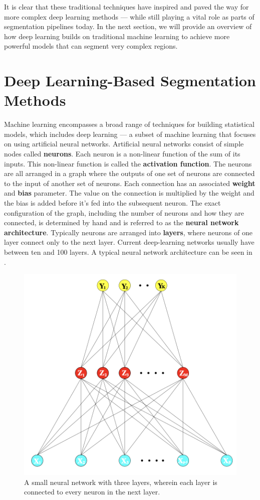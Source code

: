 It is clear that these traditional techniques have inspired and paved the way for more complex deep learning methods --- while still playing a vital role as parts of segmentation pipelines today. In the next section, we will provide an overview of how deep learning builds on traditional machine learning to achieve more powerful models that can segment very complex regions.

\pagebreak

\section{Deep Learning-Based Segmentation Methods}

Machine learning encompasses a broad range of techniques for building statistical models, which includes deep learning --- a subset of machine learning that focuses on using artificial neural networks. Artificial neural networks consist of simple nodes called \textbf{neurons}. Each neuron is a non-linear function of the sum of its inputs. This non-linear function is called the \textbf{activation function}. The neurons are all arranged in a graph where the outputs of one set of neurons are connected to the input of another set of neurons. Each connection has an associated \textbf{weight} and \textbf{bias} parameter. The value on the connection is multiplied by the weight and the bias is added before it's fed into the subsequent neuron. The exact configuration of the graph, including the number of neurons and how they are connected, is determined by hand and is referred to as the \textbf{neural network architecture}. Typically neurons are arranged into \textbf{layers}, where neurons of one layer connect only to the next layer. Current deep-learning networks usually have between ten and 100 layers. A typical neural network architecture can be seen in .

\begin{figure}[h!]
 \centering
 \includegraphics[width=0.5\linewidth]{images/nn-typical}
 \caption{A small neural network with three layers, wherein each layer is connected to every neuron in the next layer. \cite{hastieElementsStatisticalLearning2009}}
 \label{fig:nn-typical}
 \end{figure}

